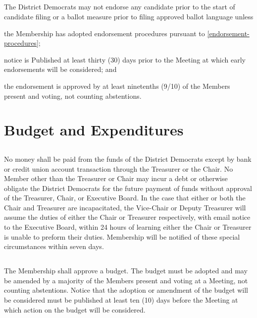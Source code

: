\subsection{}
The \fortythird{} District Democrats may not endorse any candidate prior to the start of candidate filing or a ballot measure prior to filing approved ballot language unless
\begin{inlinealphalist}
    \item the Membership has adopted endorsement procedures pursuant to \autoref{endorsement-procedures};
    \item notice is Published at least thirty (30) days prior to the Meeting at which early endorsements will be considered; and
    \item the endorsement is approved by at least ninetenths (9/10) of the Members present and voting, not counting abstentions.
\end{inlinealphalist}

\section{Budget and Expenditures}
\subsection{}
No money shall be paid from the funds of the \fortythird{} District Democrats except by bank or credit union account transaction through the Treasurer or the Chair. No Member other than the Treasurer or Chair may incur a debt or otherwise obligate the \fortythird{} District Democrats for the future payment of funds without approval of the Treasurer, Chair, or Executive Board. In the case that either or both the Chair and Treasurer are incapacitated, the Vice-Chair or Deputy Treasurer will assume the duties of either the Chair or Treasurer respectively, with email notice to the Executive Board, within 24 hours of learning either the Chair or Treasurer is unable to preform their duties. Membership will be notified of these special circumstances within seven days.

\subsection{}\label{budget-adoption}
The Membership shall approve a budget. The budget must be adopted and may be amended by a majority of the Members present and voting at a Meeting, not counting abstentions. Notice that the adoption or amendment of the budget will be considered must be published at least ten (10) days before the Meeting at which action on the budget will be considered.


